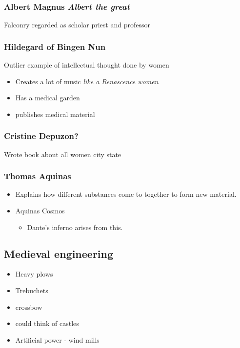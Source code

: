 \documentclass[11pt]{article}
\begin{document}
\subsubsection{Albert Magnus \emph{Albert the great}}
\label{sec-7-5-3}
Falconry regarded as scholar priest and professor


\subsubsection{Hildegard of Bingen Nun}
\label{sec-7-5-4}
Outlier example of intellectual thought done by women\\
\begin{itemize}
\item Creates a lot of music \emph{like a Renascence women}
\item Has a medical garden
\item publishes medical material
\end{itemize}

\subsubsection{Cristine Depuzon?}
\label{sec-7-5-5}
Wrote book about all women city state


\subsubsection{Thomas Aquinas}
\label{sec-7-5-6}
\begin{itemize}
\item Explains how different substances come to together to form new material.
\item Aquinas Cosmos
\begin{itemize}
\item Dante's inferno arises from this.
\end{itemize}
\end{itemize}
\subsection{Medieval engineering}
\label{sec-7-6}
\begin{itemize}
\item Heavy plows
\item Trebuchets
\item crossbow
\item could think of castles
\item Artificial power - wind mills
\end{itemize}
\end{document}
